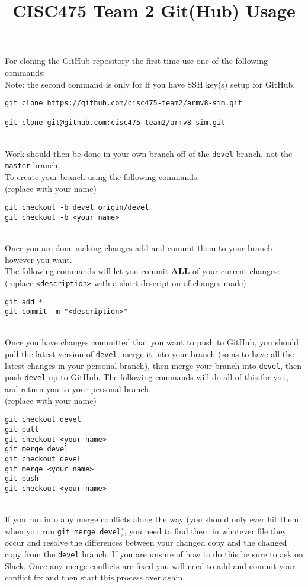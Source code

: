 \documentclass{article}
\begin{document}
\title{CISC475 Team 2 Git(Hub) Usage}
\date{}
\maketitle
\noindent
For cloning the GitHub repository the first time use one of the following commands:\\
Note: the second command is only for if you have SSH key(s) setup for GitHub.\\
\begin{verbatim}
git clone https://github.com/cisc475-team2/armv8-sim.git

git clone git@github.com:cisc475-team2/armv8-sim.git
\end{verbatim}
\ \\
Work should then be done in your own branch off of the {\tt devel} branch, not the {\tt master} branch.\\
To create your branch using the following commands:\\
(replace {\tt <your name>} with your name)\\
\begin{verbatim}
git checkout -b devel origin/devel
git checkout -b <your name>
\end{verbatim}
\ \\
Once you are done making changes add and commit them to your branch however you want.\\
The following commands will let you commit {\bf ALL} of your current changes:\\
(replace {\tt <description>} with a short description of changes made)\\
\begin{verbatim}
git add *
git commit -m "<description>"
\end{verbatim}
\ \\
Once you have changes committed that you want to push to GitHub, you should pull the latest version of {\tt devel}, merge it into your branch (so as to have all the latest changes in your personal branch), then merge your branch into {\tt devel}, then push {\tt devel} up to GitHub. The following commands will do all of this for you, and return you to your personal branch.\\
(replace {\tt <your name>} with your name)\\
\begin{verbatim}
git checkout devel
git pull
git checkout <your name>
git merge devel
git checkout devel
git merge <your name>
git push
git checkout <your name>
\end{verbatim}
\ \\
If you run into any merge conflicts along the way (you should only ever hit them when you run {\tt git merge devel}), you need to find them in whatever file they occur and resolve the differences between your changed copy and the changed copy from the {\tt devel} branch. If you are unsure of how to do this be sure to ask on Slack. Once any merge conflicts are fixed you will need to add and commit your conflict fix and then start this process over again.
\end{document}
